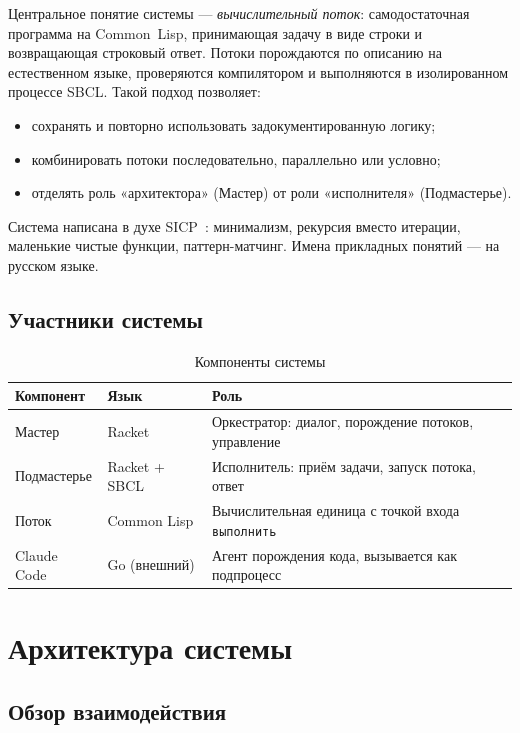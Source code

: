 \documentclass[11pt,a4paper]{article}
\begin{document}
Центральное понятие системы — \emph{вычислительный поток}: самодостаточная программа
на Common~Lisp, принимающая задачу в виде строки и возвращающая строковый ответ.
Потоки порождаются по описанию на естественном языке, проверяются компилятором и
выполняются в изолированном процессе SBCL. Такой подход позволяет:

\begin{itemize}[noitemsep]
  \item сохранять и повторно использовать задокументированную логику;
  \item комбинировать потоки последовательно, параллельно или условно;
  \item отделять роль «архитектора» (Мастер) от роли «исполнителя» (Подмастерье).
\end{itemize}

Система написана в духе SICP~\cite{sicp}: минимализм, рекурсия вместо итерации,
маленькие чистые функции, паттерн-матчинг. Имена прикладных понятий — на русском языке.

\subsection{Участники системы}

\begin{table}[H]
\centering
\begin{tabular}{lllp{6cm}}
\toprule
\textbf{Компонент} & \textbf{Язык} & \textbf{Роль} \\
\midrule
Мастер & Racket & Оркестратор: диалог, порождение потоков, управление \\
Подмастерье & Racket + SBCL & Исполнитель: приём задачи, запуск потока, ответ \\
Поток & Common Lisp & Вычислительная единица с точкой входа \texttt{выполнить} \\
Claude Code & Go (внешний) & Агент порождения кода, вызывается как подпроцесс \\
\bottomrule
\end{tabular}
\caption{Компоненты системы}
\end{table}

\section{Архитектура системы}

\subsection{Обзор взаимодействия}
\end{document}
